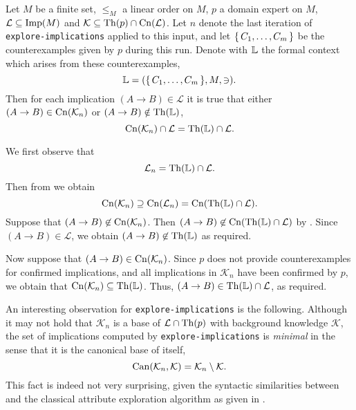 \begin{Theorem}
  \label{thm:explore-implications-counterexamples-context}
  Let $M$ be a finite set, $\leq_{M}$ a linear order on $M$, $p$ a domain expert on $M$,
  $\mathcal{L} \subseteq \operatorname{Imp}(M)$ and $\mathcal{K} \subseteq \operatorname{Th}(p) \cap
  \operatorname{Cn}(\mathcal{L})$.  Let $n$ denote the last iteration of
  \lstinline{explore-implications} applied to this input, and let ${\{\, C_{1}, \dots,
    C_{m} \,\}}$ be the counterexamples given by $p$ during this run.  Denote with ${\mathbb{L}}$
  the formal context which arises from these counterexamples, \ie
  \begin{equation*}
    {\ensuremath{\mathbb{L}}} = ({\{\, C_{1}, \dots, C_{m} \,\}}, M, \ni).
  \end{equation*}
  Then for each implication $(A \to B) \in \mathcal{L}$ it is true that either $(A \to B)
  \in \operatorname{Cn}(\mathcal{K}_{n})$ or $(A \to B) \notin \operatorname{Th}({\mathbb{L}})$, \ie
  \begin{equation*}
    \operatorname{Cn}(\mathcal{K}_{n}) \cap \mathcal{L} = \operatorname{Th}({\mathbb{L}}) \cap \mathcal{L}.
  \end{equation*}
\end{Theorem}
\begin{Proof}
  We first observe that
  \begin{equation}
    \label{eq:40}
    \mathcal{L}_{n} = \operatorname{Th}({\mathbb{L}}) \cap \mathcal{L}.
  \end{equation}
  Then from  we obtain
  \begin{equation}
    \label{eq:37}
    \operatorname{Cn}(\mathcal{K}_{n}) \supseteq \operatorname{Cn}(\mathcal{L}_{n}) = \operatorname{Cn}(\operatorname{Th}({\mathbb{L}}) \cap \mathcal{L}).
  \end{equation}
  Suppose that $(A \to B) \not\in \operatorname{Cn}(\mathcal{K}_{n})$.  Then $(A \to B) \not\in
  \operatorname{Cn}(\operatorname{Th}({\mathbb{L}}) \cap \mathcal{L})$ by .  Since $(A \to B) \in \mathcal{L}$,
  we obtain $(A \to B) \not\in \operatorname{Th}({\mathbb{L}})$ as required.

  Now suppose that $(A \to B) \in \operatorname{Cn}(\mathcal{K}_{n})$.  Since $p$ does not provide
  counterexamples for confirmed implications, and all implications in $\mathcal{K}_{n}$
  have been confirmed by $p$, we obtain that $\operatorname{Cn}(\mathcal{K}_{n}) \subseteq \operatorname{Th}({\mathbb{L}})$.  Thus, $(A \to B) \in \operatorname{Th}({\mathbb{L}}) \cap \mathcal{L}$, as required.
\end{Proof}

An interesting observation for \lstinline{explore-implications} is the following.
Although it may not hold that $\mathcal{K}_{n}$ is a base of $\mathcal{L} \cap \operatorname{Th}(p)$
with background knowledge $\mathcal{K}$, the set of implications computed by
\lstinline{explore-implications} is \emph{minimal} in the sense that it is the canonical
base of itself, \ie
\begin{equation*}
  \operatorname{Can}(\mathcal{K}_{n}, \mathcal{K}) = \mathcal{K}_{n} \setminus \mathcal{K}.
\end{equation*}
This fact is indeed not very surprising, given the syntactic similarities between
 and the classical attribute exploration algorithm as given
in .

